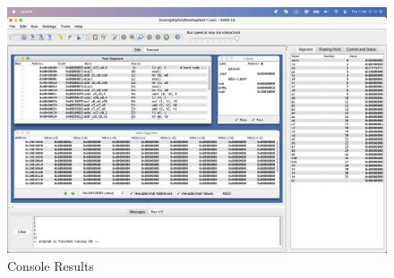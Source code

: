 \documentclass[10pt,a4paper]{article}
\begin{document}
\begin{ans}
\begin{figure}[H]
    \caption{Console Results}
    \includegraphics[width=1\linewidth]{Lab1-1-5.png}
\end{figure}
 
\end{ans}

\pagebreak
\end{document}
